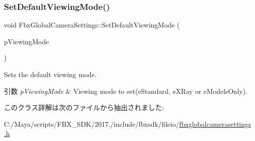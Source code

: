 \subsubsection{\texorpdfstring{Set\+Default\+Viewing\+Mode()}{SetDefaultViewingMode()}}
{\footnotesize\ttfamily void Fbx\+Global\+Camera\+Settings\+::\+Set\+Default\+Viewing\+Mode (\begin{DoxyParamCaption}\item[{\hyperlink{class_fbx_global_camera_settings_aaa674f8b39e4cd57d7cc07f381f11858}{E\+Viewing\+Mode}}]{p\+Viewing\+Mode }\end{DoxyParamCaption})}

Sets the default viewing mode. 
\begin{DoxyParams}{引数}
{\em p\+Viewing\+Mode} & Viewing mode to set(e\+Standard, e\+X\+Ray or e\+Models\+Only). \\
\hline
\end{DoxyParams}


このクラス詳解は次のファイルから抽出されました\+:\begin{DoxyCompactItemize}
\item 
C\+:/\+Maya/scripts/\+F\+B\+X\+\_\+\+S\+D\+K/2017./include/fbxsdk/fileio/\hyperlink{fbxglobalcamerasettings_8h}{fbxglobalcamerasettings.\+h}\end{DoxyCompactItemize}
